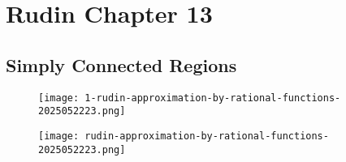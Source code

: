 \section{Rudin Chapter 13}

\subsection{Simply Connected Regions}

\begin{figure}[H]
\centering
\texttt{[image: 1-rudin-approximation-by-rational-functions-2025052223.png]}
\label{}
\end{figure}

\begin{figure}[H]
\centering
\texttt{[image: rudin-approximation-by-rational-functions-2025052223.png]}
\label{}
\end{figure}
